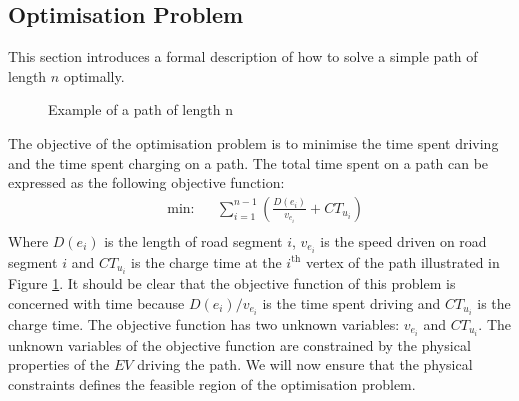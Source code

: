 \subsection{Optimisation Problem}\label{sec:optiprob}
This section introduces a formal description of how to solve a simple path of length $n$ optimally.

\begin{figure}[!htb]
\centering
    \caption{Example of a path of length n} \label{fig:pathexample}
\end{figure}

The objective of the optimisation problem is to minimise the time spent driving and the time spent charging on a path. The total time spent on a path can be expressed as the following objective function:
\begin{equation*}
\begin{aligned} &
{\text{min:}}
& & \sum_{i=1}^{n-1} \left(\frac{D(e_i)}{v_{e_i}} + CT_{u_i} \right)\\
\end{aligned}
\end{equation*}
Where $D(e_i)$ is the length of road segment $i$, $v_{e_i}$ is the speed driven on road segment $i$ and $CT_{u_i}$ is the charge time at the $i^{\text{th}}$ vertex of the path illustrated in Figure \ref{fig:pathexample}. It should be clear that the objective function of this problem is concerned with time because \( D(e_i)/v_{e_i} \) is the time spent driving and $CT_{u_i}$ is the charge time. The objective function has two unknown variables: $v_{e_i}$ and $CT_{u_i}$. The unknown variables of the objective function are constrained by the physical properties of the $EV$ driving the path. We will now ensure that the physical constraints defines the feasible region of the optimisation problem.

